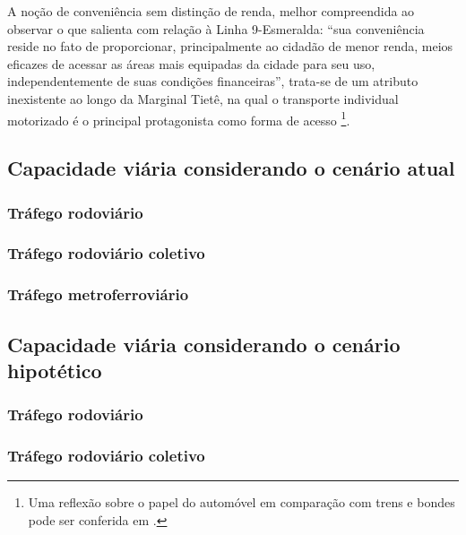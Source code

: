 \documentclass[
article,			%
11pt,				%
oneside,			%
a4paper,			%
english,			%
brazil,				%
sumario=tradicional
]{abntex2}
\begin{document}
	A noção de conveniência sem distinção de renda, melhor compreendida ao observar o que  salienta com relação à Linha 9-Esmeralda: ``sua conveniência reside no fato de proporcionar, principalmente ao cidadão de menor renda, meios eficazes de acessar as áreas mais equipadas da cidade para seu uso, independentemente de suas condições financeiras'', trata-se de um atributo inexistente ao longo da Marginal Tietê, na qual o transporte individual motorizado é o principal protagonista como forma de acesso \footnote{Uma reflexão sobre o papel do automóvel em comparação com trens e bondes pode ser conferida em \cite[p. 147--149]{franco2005a}.}.
	
	\subsection{Capacidade viária considerando o cenário atual} \label{s2:capacidadeatual}
	
	\subsubsection{Tráfego rodoviário} \label{s3:rodoatual}
	
	\subsubsection{Tráfego rodoviário coletivo} \label{s3:coletivoatual}
	
	\subsubsection{Tráfego metroferroviário} \label{s3:metroatual}
	
	\subsection{Capacidade viária considerando o cenário hipotético} \label{s2:capacidadefuturo}
	
	\subsubsection{Tráfego rodoviário} \label{s3:rodofuturo}
	
	\subsubsection{Tráfego rodoviário coletivo} \label{s3:coletivofuturo}
	
\end{document}
